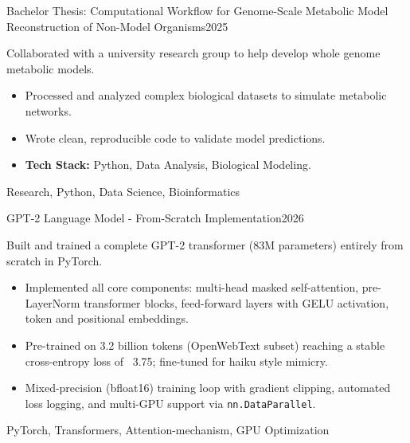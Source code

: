 %
%
%


\begin{projects}
  \project
	{Bachelor Thesis: Computational Workflow for Genome-Scale Metabolic Model Reconstruction of Non-Model Organisms}{2025}
	{
  }
	{Collaborated with a university research group to help develop whole genome metabolic models.
	\begin{itemize}
		\item Processed and analyzed complex biological datasets to simulate metabolic networks.
        \item Wrote clean, reproducible code to validate model predictions.
        \item \textbf{Tech Stack:} Python, Data Analysis, Biological Modeling.
	\end{itemize}
	}
	{Research, Python, Data Science, Bioinformatics}

	\project
	{GPT-2 Language Model - From-Scratch Implementation}{2026}
	{}
	{Built and trained a complete GPT-2 transformer (83M parameters) entirely from scratch in PyTorch.
	\begin{itemize}
		\item Implemented all core components: multi-head masked self-attention, pre-LayerNorm transformer blocks, feed-forward layers with GELU activation, token and positional embeddings.
    \item Pre-trained on 3.2 billion tokens (OpenWebText subset) reaching a stable cross-entropy loss of ~3.75; fine-tuned for haiku style mimicry.
    \item Mixed-precision (bfloat16) training loop with gradient clipping, automated loss logging, and multi-GPU support via \texttt{nn.DataParallel}.
	\end{itemize}
	}
	{PyTorch, Transformers, Attention-mechanism, GPU Optimization}


\end{projects}
